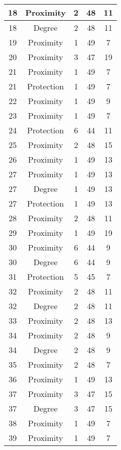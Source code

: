 \documentclass[results.tex]{subfiles}
\begin{document}
\begin{center}
\begin{tabular}{| c || c | c | c | c |}
    \hline
    18 & Proximity & 2 & 48 & 11 \\ 
    \hline
    18 & Degree & 2 & 48 & 11 \\ 
    \hline
    19 & Proximity & 1 & 49 & 7 \\ 
    \hline
    20 & Proximity & 3 & 47 & 19 \\ 
    \hline
    21 & Proximity & 1 & 49 & 7 \\ 
    \hline
    21 & Protection & 1 & 49 & 7 \\ 
    \hline
    22 & Proximity & 1 & 49 & 9 \\ 
    \hline
    23 & Proximity & 1 & 49 & 7 \\ 
    \hline
    24 & Protection & 6 & 44 & 11 \\ 
    \hline
    25 & Proximity & 2 & 48 & 15 \\ 
    \hline
    26 & Proximity & 1 & 49 & 13 \\ 
    \hline
    27 & Proximity & 1 & 49 & 13 \\ 
    \hline
    27 & Degree & 1 & 49 & 13 \\ 
    \hline
    27 & Protection & 1 & 49 & 13 \\ 
    \hline
    28 & Proximity & 2 & 48 & 11 \\ 
    \hline
    29 & Proximity & 1 & 49 & 19 \\ 
    \hline
    30 & Proximity & 6 & 44 & 9 \\ 
    \hline
    30 & Degree & 6 & 44 & 9 \\ 
    \hline
    31 & Protection & 5 & 45 & 7 \\ 
    \hline
    32 & Proximity & 2 & 48 & 11 \\ 
    \hline
    32 & Degree & 2 & 48 & 11 \\ 
    \hline
    33 & Proximity & 2 & 48 & 13 \\ 
    \hline
    34 & Proximity & 2 & 48 & 9 \\ 
    \hline
    34 & Degree & 2 & 48 & 9 \\ 
    \hline
    35 & Proximity & 2 & 48 & 7 \\ 
    \hline
    36 & Proximity & 1 & 49 & 13 \\ 
    \hline
    37 & Proximity & 3 & 47 & 15 \\ 
    \hline
    37 & Degree & 3 & 47 & 15 \\ 
    \hline
    38 & Proximity & 1 & 49 & 7 \\ 
    \hline
    39 & Proximity & 1 & 49 & 7 \\ 

\end{tabular}
\end{center}
\end{document}
